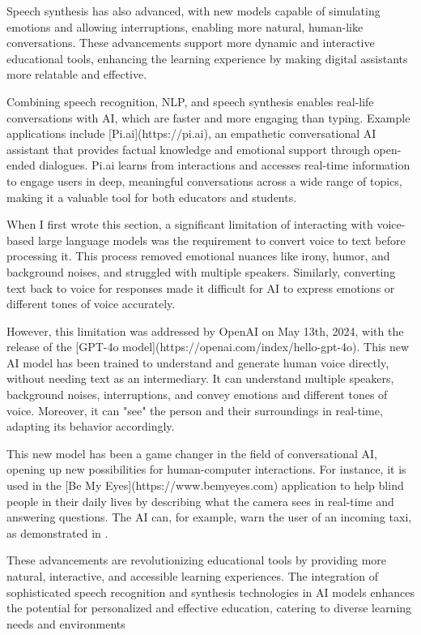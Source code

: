 \documentclass{article}
\begin{document}
Speech synthesis has also advanced, with new models capable of simulating emotions and allowing interruptions, enabling more natural, human-like conversations. These advancements support more dynamic and interactive educational tools, enhancing the learning experience by making digital assistants more relatable and effective.

Combining speech recognition, NLP, and speech synthesis enables real-life conversations with AI, which are faster and more engaging than typing. Example applications include [Pi.ai](https://pi.ai), an empathetic conversational AI assistant that provides factual knowledge and emotional support through open-ended dialogues. Pi.ai learns from interactions and accesses real-time information to engage users in deep, meaningful conversations across a wide range of topics, making it a valuable tool for both educators and students.

When I first wrote this section, a significant limitation of interacting with voice-based large language models was the requirement to convert voice to text before processing it. This process removed emotional nuances like irony, humor, and background noises, and struggled with multiple speakers. Similarly, converting text back to voice for responses made it difficult for AI to express emotions or different tones of voice accurately.

However, this limitation was addressed by OpenAI on May 13th, 2024, with the release of the [GPT-4o model](https://openai.com/index/hello-gpt-4o). This new AI model has been trained to understand and generate human voice directly, without needing text as an intermediary. It can understand multiple speakers, background noises, interruptions, and convey emotions and different tones of voice. Moreover, it can "see" the person and their surroundings in real-time, adapting its behavior accordingly.

This new model has been a game changer in the field of conversational AI, opening up new possibilities for human-computer interactions. For instance, it is used in the [Be My Eyes](https://www.bemyeyes.com) application to help blind people in their daily lives by describing what the camera sees in real-time and answering questions. The AI can, for example, warn the user of an incoming taxi, as demonstrated in \cite{youtube_bemyeyes_gpt4o}.

These advancements are revolutionizing educational tools by providing more natural, interactive, and accessible learning experiences. The integration of sophisticated speech recognition and synthesis technologies in AI models enhances the potential for personalized and effective education, catering to diverse learning needs and environments
\end{document}
